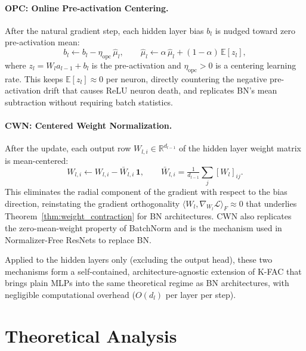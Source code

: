 \documentclass{article}
\providecommand{\R}{\mathbb{R}}
\providecommand{\E}{\mathbb{E}}
\theoremstyle{plain}
\theoremstyle{definition}
\theoremstyle{remark}
\begin{document}
\paragraph{OPC: Online Pre-activation Centering.}
After the natural gradient step, each hidden layer bias $b_l$ is nudged toward zero pre-activation mean:
\begin{equation}
    b_l \leftarrow b_l - \eta_{\mathrm{opc}}\,\hat{\mu}_l, \qquad \hat{\mu}_l \leftarrow \alpha\,\hat{\mu}_l + (1-\alpha)\,\E[z_l],
\end{equation}
where $z_l = W_l a_{l-1} + b_l$ is the pre-activation and $\eta_{\mathrm{opc}} > 0$ is a centering learning rate. This keeps $\E[z_l] \approx 0$ per neuron, directly countering the negative pre-activation drift that causes ReLU neuron death, and replicates BN's mean subtraction without requiring batch statistics.

\paragraph{CWN: Centered Weight Normalization.}
After the update, each output row $W_{l,i} \in \R^{d_{l-1}}$ of the hidden layer weight matrix is mean-centered:
\begin{equation}
    W_{l,i} \leftarrow W_{l,i} - \bar{W}_{l,i}\,\mathbf{1}, \qquad \bar{W}_{l,i} = \tfrac{1}{d_{l-1}}\sum_j [W_l]_{ij}.
\end{equation}
This eliminates the radial component of the gradient with respect to the bias direction, reinstating the gradient orthogonality $\langle W_l, \nabla_{W_l}\mathcal{L}\rangle_F \approx 0$ that underlies Theorem~\ref{thm:weight_contraction} for BN architectures. CWN also replicates the zero-mean-weight property of BatchNorm \citep{huang2017centered} and is the mechanism used in Normalizer-Free ResNets to replace BN.

Applied to the hidden layers only (excluding the output head), these two mechanisms form a self-contained, architecture-agnostic extension of K-FAC that brings plain MLPs into the same theoretical regime as BN architectures, with negligible computational overhead ($O(d_l)$ per layer per step).

\section{Theoretical Analysis}
\label{sec:theory}
\end{document}
